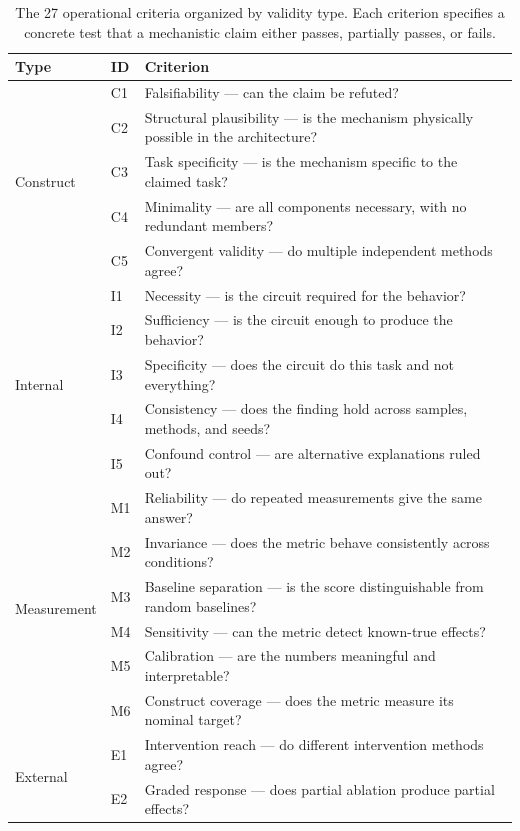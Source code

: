 \documentclass[10pt]{article}
\newcommand{\tighttable}{\setlength{\tabcolsep}{4pt}\renewcommand{\arraystretch}{1.05}}
\begin{document}
\begin{table}[t]
\centering
\tighttable
\caption{The 27 operational criteria organized by validity type. Each criterion specifies a concrete test that a mechanistic claim either passes, partially passes, or fails.}
\label{tab:criteria}
\small
\begin{tabular}{@{}llp{7.5cm}@{}}
\toprule
\textbf{Type} & \textbf{ID} & \textbf{Criterion} \\
\midrule
\multirow{5}{*}{Construct} & C1 & Falsifiability --- can the claim be refuted? \\
& C2 & Structural plausibility --- is the mechanism physically possible in the architecture? \\
& C3 & Task specificity --- is the mechanism specific to the claimed task? \\
& C4 & Minimality --- are all components necessary, with no redundant members? \\
& C5 & Convergent validity --- do multiple independent methods agree? \\
\midrule
\multirow{5}{*}{Internal} & I1 & Necessity --- is the circuit required for the behavior? \\
& I2 & Sufficiency --- is the circuit enough to produce the behavior? \\
& I3 & Specificity --- does the circuit do this task and not everything? \\
& I4 & Consistency --- does the finding hold across samples, methods, and seeds? \\
& I5 & Confound control --- are alternative explanations ruled out? \\
\midrule
\multirow{6}{*}{Measurement} & M1 & Reliability --- do repeated measurements give the same answer? \\
& M2 & Invariance --- does the metric behave consistently across conditions? \\
& M3 & Baseline separation --- is the score distinguishable from random baselines? \\
& M4 & Sensitivity --- can the metric detect known-true effects? \\
& M5 & Calibration --- are the numbers meaningful and interpretable? \\
& M6 & Construct coverage --- does the metric measure its nominal target? \\
\midrule
\multirow{6}{*}{External} & E1 & Intervention reach --- do different intervention methods agree? \\
& E2 & Graded response --- does partial ablation produce partial effects? \\

\end{tabular}
\end{table}
\end{document}
